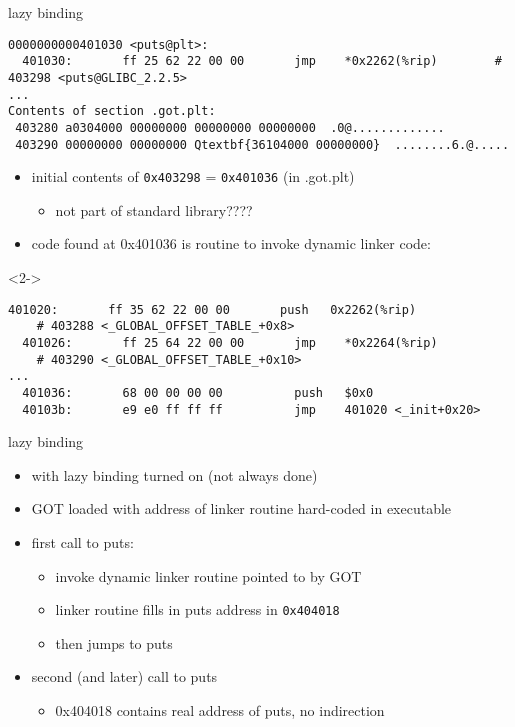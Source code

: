 
\begin{frame}[fragile,label=dynamicPutsLazy]{lazy binding}
\begin{Verbatim}[commandchars=Q\{\},fontsize=\fontsize{8}{9}\selectfont]
0000000000401030 <puts@plt>:
  401030:       ff 25 62 22 00 00       jmp    *0x2262(%rip)        # 403298 <puts@GLIBC_2.2.5>
...
Contents of section .got.plt:
 403280 a0304000 00000000 00000000 00000000  .0@.............
 403290 00000000 00000000 Qtextbf{36104000 00000000}  ........6.@.....
\end{Verbatim}
\begin{itemize}
\item initial contents of {\tt 0x403298} = {\tt 0x401036} (in .got.plt)
    \begin{itemize}
    \item not part of standard library????
    \end{itemize}
\item<2-> code found at 0x401036 is routine to invoke dynamic linker code:
\end{itemize}
\begin{visibleenv}<2->
\begin{Verbatim}[commandchars=Q\{\},fontsize=\fontsize{8}{9}\selectfont]
  401020:       ff 35 62 22 00 00       push   0x2262(%rip)       
    # 403288 <_GLOBAL_OFFSET_TABLE_+0x8>
  401026:       ff 25 64 22 00 00       jmp    *0x2264(%rip)    
    # 403290 <_GLOBAL_OFFSET_TABLE_+0x10>
...
  401036:       68 00 00 00 00          push   $0x0
  40103b:       e9 e0 ff ff ff          jmp    401020 <_init+0x20>
\end{Verbatim}
\end{visibleenv}
\end{frame}

\begin{frame}{lazy binding}
\begin{itemize}
\item with lazy binding turned on (not always done)
\vspace{.5cm}
\item GOT loaded with address of linker routine hard-coded in executable
\item first call to puts:
    \begin{itemize}
    \item invoke dynamic linker routine pointed to by GOT
    \item linker routine fills in puts address in {\tt 0x404018}
    \item then jumps to puts
    \end{itemize}
\item second (and later) call to puts
    \begin{itemize}
    \item 0x404018 contains real address of puts, no indirection
    \end{itemize}
\end{itemize}
\end{frame}

